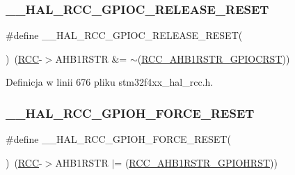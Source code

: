 \subsubsection{\texorpdfstring{\+\_\+\+\_\+\+H\+A\+L\+\_\+\+R\+C\+C\+\_\+\+G\+P\+I\+O\+C\+\_\+\+R\+E\+L\+E\+A\+S\+E\+\_\+\+R\+E\+S\+ET}{\_\_HAL\_RCC\_GPIOC\_RELEASE\_RESET}}
{\footnotesize\ttfamily \#define \+\_\+\+\_\+\+H\+A\+L\+\_\+\+R\+C\+C\+\_\+\+G\+P\+I\+O\+C\+\_\+\+R\+E\+L\+E\+A\+S\+E\+\_\+\+R\+E\+S\+ET(\begin{DoxyParamCaption}{ }\end{DoxyParamCaption})~(\hyperlink{group___peripheral__declaration_ga74944438a086975793d26ae48d5882d4}{R\+CC}-\/$>$A\+H\+B1\+R\+S\+TR \&= $\sim$(\hyperlink{group___peripheral___registers___bits___definition_ga8d02a09e1dafda744c7b27dca99fa3ef}{R\+C\+C\+\_\+\+A\+H\+B1\+R\+S\+T\+R\+\_\+\+G\+P\+I\+O\+C\+R\+ST}))}



Definicja w linii 676 pliku stm32f4xx\+\_\+hal\+\_\+rcc.\+h.

\mbox{\label{group___r_c_c___a_h_b1___force___release___reset_ga4f05c575d762edf40a6d17f88671b68d}} 
\subsubsection{\texorpdfstring{\+\_\+\+\_\+\+H\+A\+L\+\_\+\+R\+C\+C\+\_\+\+G\+P\+I\+O\+H\+\_\+\+F\+O\+R\+C\+E\+\_\+\+R\+E\+S\+ET}{\_\_HAL\_RCC\_GPIOH\_FORCE\_RESET}}
{\footnotesize\ttfamily \#define \+\_\+\+\_\+\+H\+A\+L\+\_\+\+R\+C\+C\+\_\+\+G\+P\+I\+O\+H\+\_\+\+F\+O\+R\+C\+E\+\_\+\+R\+E\+S\+ET(\begin{DoxyParamCaption}{ }\end{DoxyParamCaption})~(\hyperlink{group___peripheral__declaration_ga74944438a086975793d26ae48d5882d4}{R\+CC}-\/$>$A\+H\+B1\+R\+S\+TR $\vert$= (\hyperlink{group___peripheral___registers___bits___definition_ga587e3e32701cbd127d2afb19b9bff5fd}{R\+C\+C\+\_\+\+A\+H\+B1\+R\+S\+T\+R\+\_\+\+G\+P\+I\+O\+H\+R\+ST}))}



